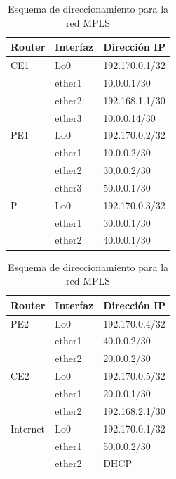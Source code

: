 \begin{table}[htb]
	\centering
	\begin{subtable}[b]{0.475\textwidth}
		\centering
		\begin{tabular}{|l|l|l|}
			\hline
			\textbf{Router} & \textbf{Interfaz} & \textbf{Dirección IP} \\ \hline
			CE1             & Lo0               & 192.170.0.1/32        \\ \cline{2-3}
			                & ether1            & 10.0.0.1/30           \\ \cline{2-3}
			                & ether2            & 192.168.1.1/30        \\ \cline{2-3}
			                & ether3            & 10.0.0.14/30          \\ \hline
			PE1             & Lo0               & 192.170.0.2/32        \\ \cline{2-3}
			                & ether1            & 10.0.0.2/30           \\ \cline{2-3}
			                & ether2            & 30.0.0.2/30           \\ \cline{2-3}
			                & ether3            & 50.0.0.1/30           \\ \hline
			P               & Lo0               & 192.170.0.3/32        \\ \cline{2-3}
			                & ether1            & 30.0.0.1/30           \\ \cline{2-3}
			                & ether2            & 40.0.0.1/30           \\ \hline
		\end{tabular}
	\end{subtable}
	\hfill
	\begin{subtable}[b]{0.475\textwidth}
		\centering
		\begin{tabular}{|l|l|l|}
			\hline
			\textbf{Router} & \textbf{Interfaz} & \textbf{Dirección IP} \\ \hline
			PE2             & Lo0               & 192.170.0.4/32        \\ \cline{2-3}
			                & ether1            & 40.0.0.2/30           \\ \cline{2-3}
			                & ether2            & 20.0.0.2/30           \\ \hline
			CE2             & Lo0               & 192.170.0.5/32        \\ \cline{2-3}
			                & ether1            & 20.0.0.1/30           \\ \cline{2-3}
			                & ether2            & 192.168.2.1/30        \\ \hline
			Internet        & Lo0               & 192.170.0.1/32        \\ \cline{2-3}
			                & ether1            & 50.0.0.2/30           \\ \cline{2-3}
			                & ether2            & DHCP                  \\ \hline
		\end{tabular}
	\end{subtable}
	\caption{Esquema de direccionamiento para la red MPLS}
	\label{tab:tabla_direccionamiento_red_completa}
\end{table}

